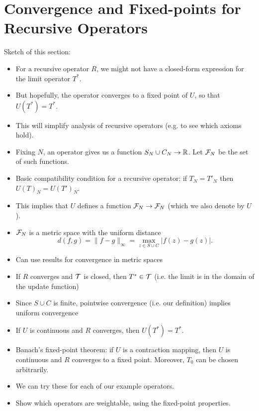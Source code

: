 
\section{Convergence and Fixed-points for Recursive Operators}
\label{td_new_sec_convergence_fixed_points}

\begin{notes}
    Sketch of this section:
    \begin{itemize}
        \item For a recursive operator $R$, we might not have a closed-form
              expression for the limit operator $T^*$.
        \item But hopefully, the operator converges to a fixed point of $U$, so
            that $U(T^*) = T^*$.
        \item This will simplify analysis of recursive operators (e.g. to see
              which axioms hold).
        \item Fixing $N$, an operator gives us a function $S_N \cup C_N \to
              \mathbb{R}$. Let $\mathcal{F}_N$ be the set of such functions.
        \item Basic compatibility condition for a recursive operator: if $T_N =
            T'_N$ then $U(T)_N = U(T')_N$.
        \item This implies that $U$ defines a function $\mathcal{F}_N \to \mathcal{F}_N$ (which
            we also denote by $U$).
        \item $\mathcal{F}_N$ is a metric space with the uniform distance
            \[
                d(f, g) = \|f - g\|_{\infty}
                = \max_{z \in S \cup C}{|f(z) - g(z)|}.
            \]
        \item Can use results for convergence in metric spaces
        \item If $R$ converges and $\mathcal{T}$ is closed, then $T^* \in \mathcal{T}$
            (i.e. the limit is in the domain of the update function)
        \item Since $S \cup C$ is finite, pointwise convergence (i.e. our
            definition) implies uniform convergence
        \item If $U$ is continuous and $R$ converges, then $U(T^*) = T^*$.
        \item Banach's fixed-point theorem: if $U$ is a contraction mapping,
              then $U$ is continuous and $R$ converges to a fixed point.
              Moreover, $T_0$ can be chosen arbitrarily.
        \item We can try these for each of our example operators.
        \item Show which operators are weightable, using the fixed-point
              properties.
    \end{itemize}
\end{notes}

